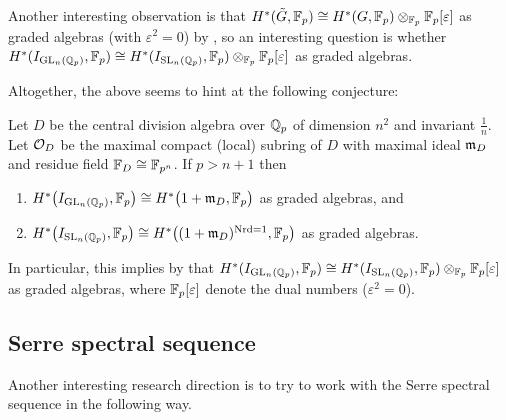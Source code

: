 Another interesting observation is that $H^{*}(\tilde{G},\mathbb{F}_{p}) \cong H^{*}(G,\mathbb{F}_{p}) \otimes_{\mathbb{F}_{p}} \mathbb{F}_{p}[\varepsilon]$ as graded algebras (with $\varepsilon^{2} = 0$) by \cite[Sect.~6.3]{Sor}, so an interesting question is whether $H^{*}(I_{\operatorname{GL}_{n}(\mathbb{Q}_{p})},\mathbb{F}_{p}) \cong H^{*}(I_{\operatorname{SL}_{n}(\mathbb{Q}_{p})},\mathbb{F}_{p}) \otimes_{\mathbb{F}_{p}} \mathbb{F}_{p}[\varepsilon]$ as graded algebras.

Altogether, the above seems to hint at the following conjecture:

\begin{conjecture}
  Let $D$ be the central division algebra over $\mathbb{Q}_{p}$ of dimension $n^{2}$ and invariant $\frac{1}{n}$. Let $\mathcal{O}_{D}$ be the maximal compact (local) subring of $D$ with maximal ideal $\mathfrak{m}_{D}$ and residue field $\mathbb{F}_{D} \cong \mathbb{F}_{p^{n}}$. If $p > n+1$ then
  \begin{enumerate}[$\bullet$]
    \item $H^{*}\bigl( I_{\operatorname{GL}_{n}(\mathbb{Q}_{p})}, \mathbb{F}_{p} \bigr) \cong H^{*}\bigl( 1+\mathfrak{m}_{D}, \mathbb{F}_{p} \bigr)$ as graded algebras, and
    \item $H^{*}\bigl( I_{\operatorname{SL}_{n}(\mathbb{Q}_{p})}, \mathbb{F}_{p} \bigr) \cong H^{*}\bigl( (1+\mathfrak{m}_{D})^{\operatorname{Nrd} = 1}, \mathbb{F}_{p} \bigr)$ as graded algebras.
  \end{enumerate}
  In particular, this implies by \cite[Sect.~6.3]{Sor} that $H^{*}( I_{\operatorname{GL}_{n}(\mathbb{Q}_{p})}, \mathbb{F}_{p} ) \cong H^{*}( I_{\operatorname{SL}_{n}(\mathbb{Q}_{p})}, \mathbb{F}_{p} ) \otimes_{\mathbb{F}_{p}} \mathbb{F}_{p}[\varepsilon]$ as graded algebras, where $\mathbb{F}_{p}[\varepsilon]$ denote the dual numbers ($\varepsilon^{2} = 0$).
\end{conjecture}

\subsection{Serre spectral sequence}%
\label{subsec:Serre-spec-seq}

Another interesting research direction is to try to work with the Serre spectral sequence in the following way.

